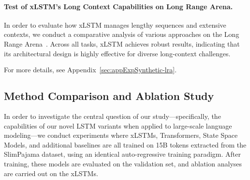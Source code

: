 \paragraph{Test of xLSTM's Long Context Capabilities on Long Range Arena.} In order to evaluate how xLSTM manages lengthy sequences and extensive contexts, we conduct a comparative analysis of various approaches on the Long Range Arena~\citep{Tay:21}. Across all tasks, xLSTM achieves robust results, indicating that its architectural design is highly effective for diverse long-context challenges.

For more details, see Appendix~\ref{sec:appExpSynthetic-lra}.

\subsection{Method Comparison and Ablation Study}
\label{sec:ExpComparison}

In order to investigate the central question of our study—specifically, the capabilities of our novel LSTM variants when applied to large-scale language modeling—we conduct experiments where xLSTMs, Transformers, State Space Models, and additional baselines are all trained on 15B tokens extracted from the SlimPajama dataset, using an identical auto-regressive training paradigm. After training, these models are evaluated on the validation set, and ablation analyses are carried out on the xLSTMs.

